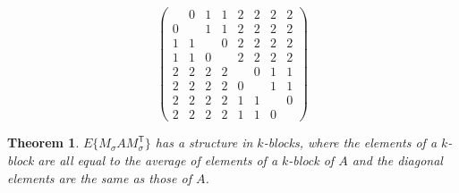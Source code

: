 \documentclass[12pt]{article}
\newtheorem{basictheorem}{Theorem}
\begin{document}
  \begin{equation*}
    \left( \begin{array}{cccccccc}
       & 0 & 1 & 1 & 2 & 2 & 2 & 2 \\
      0 &  & 1 & 1 & 2 & 2 & 2 & 2 \\
      1 & 1 &  & 0 & 2 & 2 & 2 & 2 \\
      1 & 1 & 0 &  & 2 & 2 & 2 & 2 \\
      2 & 2 & 2 & 2 &  & 0 & 1 & 1  \\
      2 & 2 & 2 & 2 & 0 &  & 1 & 1  \\
      2 & 2 & 2 & 2 & 1 & 1 &  & 0  \\
      2 & 2 & 2 & 2 & 1 & 1 & 0 &  
    \end{array} \right)
  \end{equation*}

  \begin{basictheorem}\label{acmatrix}
    $E\{M_\sigma A M_\sigma^\mathsf{T}\}$ has a structure in $k$-blocks,
    where the elements of a $k$-block are all equal to the average of
    elements of a $k$-block of $A$ and the diagonal elements are the
    same as those of $A$.
  \end{basictheorem}
\end{document}

